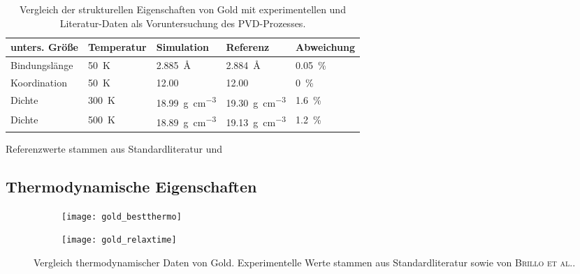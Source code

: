 \begin{table}[hbt]
  \begin{threeparttable}
  \oddrowcolors
  \caption[Vergleich struktureller Eigenschaften von Gold]{
    Vergleich der strukturellen Eigenschaften von Gold mit experimentellen und Literatur-Daten als Voruntersuchung des PVD-Prozesses.
  }
  \label{tab:goldpreresults}
  \begin{tabularx}{\textwidth}{|lXXXX|}
    \hline
    \textbf{unters. Größe} & \textbf{Temperatur} & \textbf{Simulation}                     & \textbf{Referenz}\tnote{a}                       & \textbf{Abweichung} \\
    \hline
    Bindungslänge          & \SI{50}{\kelvin}    & \SI{2.885}{\angstrom}                   & \SI{2.884}{\angstrom}                   & \SI{0.05}{\percent} \\
    Koordination           & \SI{50}{\kelvin}    & \SI{12.00}{}                            & \SI{12.00}{}                            & \SI{0}{\percent}    \\
    Dichte                 & \SI{300}{\kelvin}   & \SI{18.99}{\gram\per\cubic\centi\meter} & \SI{19.30}{\gram\per\cubic\centi\meter} & \SI{1.6}{\percent}  \\
    Dichte                 & \SI{500}{\kelvin}   & \SI{18.89}{\gram\per\cubic\centi\meter} & \SI{19.13}{\gram\per\cubic\centi\meter} & \SI{1.2}{\percent}  \\
    \hline
  \end{tabularx}
  \begin{tablenotes}
    \item[a] Referenzwerte stammen aus Standardliteratur und \cite{miller_effect_2006}
  \end{tablenotes}
  \end{threeparttable}
\end{table}

\subsection{Thermodynamische Eigenschaften}
\label{goldthermo}

\begin{figure}[bh]
  \captionsetup[subfigure]{singlelinecheck=false}
  \def\subfigwidth{7cm}
  \begin{subfigure}[t]{\subfigwidth}
    \texttt{[image: gold\_bestthermo]}
    \label{fig:goldthermo-a}
  \end{subfigure}
  \hfill
  \begin{subfigure}[t]{\subfigwidth}
    \texttt{[image: gold\_relaxtime]}
    \label{fig:goldthermo-b}
  \end{subfigure}
  \caption[Vergleich thermodynamischer Daten von Gold]{
    Vergleich thermodynamischer Daten von Gold.
    Experimentelle Werte stammen aus Standardliteratur sowie von \textsc{Brillo et al.}\cite{brillo_density_2006}.
  }
  \label{fig:goldthermo}
\end{figure}


